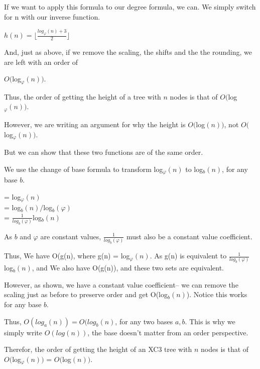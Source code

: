 \documentclass{article}
\begin{document}
If we want to apply this formula to our degree formula, we can.
We simply switch for n with our inverse function.
{
\begin{center}
    $h(n) = \lfloor \frac{log_{\varphi}(n)+3}{2} \rfloor$\\
    $ $
\end{center}
}
And, just as above, if we remove the scaling, the shifts and the the rounding, we are left with an order of 
    \begin{center}
    $O($log$_{\varphi}(n))$.
    \end{center}
Thus, the order of getting the height of a tree with $n$ nodes is that of $O($log$_{\varphi}(n))$.

However, we are writing an argument for why the height is $O($log$(n))$, not $O($log$_{\varphi}(n))$.

But we can show that these two functions are of the same order.

We use the change of base formula to transform log$_{\varphi}(n)$ to log$_{b}(n)$, for any base $b$.

\begin{center}
    = log$_{\varphi}(n)$\\
    = log$_{b}(n) / $log$_{b}(\varphi)$\\
    = $\frac{1}{log_{b}(\varphi)}$log$_{b}(n)$\\
\end{center}

As $b$ and $\varphi$ are constant values, $\frac{1}{log_{b}(\varphi)}$ must also be a constant value coefficient.

Thus, We have O(g(n), where g(n) = log$_{\varphi}(n)$. As g(n) is equivalent to $\frac{1}{log_{b}(\varphi)}$log$_{b}(n)$, and We also have O(g(n)), and these two sets are equivalent. 

However, as shown, we have a constant value coefficient-- we can remove the scaling just as before to preserve order and get O(log$_{b}(n)$). Notice this works for any base $b$.

Thus, $O(log_{a}(n)) = O(log_{b}(n)$, for any two bases $a, b$. This is why we simply write $O(log(n))$, the base doesn't matter from an order perspective.

Therefor, the order of getting the height of an XC3 tree with $n$ nodes is that of $O($log$_{\varphi}(n))$ = $O($log$(n))$.

\end{document}
